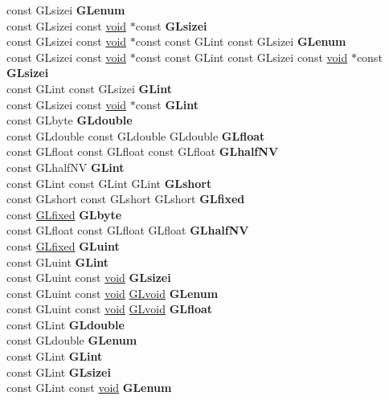 \begin{DoxyCompactItemize}
\begin{tabbing}
\>const GLsizei {\bfseries GLenum}\\
\>const GLsizei const \hyperlink{interfacevoid}{void} $\ast$const {\bfseries GLsizei}\\
\>const GLsizei const \hyperlink{interfacevoid}{void} $\ast$const const GLint const GLsizei {\bfseries GLenum}\\
\>const GLsizei const \hyperlink{interfacevoid}{void} $\ast$const const GLint const GLsizei const \hyperlink{interfacevoid}{void} $\ast$const {\bfseries GLsizei}\\
\>const GLint const GLsizei {\bfseries GLint}\\
\>const GLsizei const \hyperlink{interfacevoid}{void} $\ast$const {\bfseries GLint}\\
\>const GLbyte {\bfseries GLdouble}\\
\>const GLdouble const GLdouble GLdouble {\bfseries GLfloat}\\
\>const GLfloat const GLfloat const GLfloat {\bfseries GLhalfNV}\\
\>const GLhalfNV {\bfseries GLint}\\
\>const GLint const GLint GLint {\bfseries GLshort}\\
\>const GLshort const GLshort GLshort {\bfseries GLfixed}\\
\>const \hyperlink{glheader_8h_ad6d3fa892df40dedf48ee6d84529ae5e}{GLfixed} {\bfseries GLbyte}\\
\>const GLfloat const GLfloat GLfloat {\bfseries GLhalfNV}\\
\>const \hyperlink{glheader_8h_ad6d3fa892df40dedf48ee6d84529ae5e}{GLfixed} {\bfseries GLuint}\\
\>const GLuint {\bfseries GLint}\\
\>const GLuint const \hyperlink{interfacevoid}{void} {\bfseries GLsizei}\\
\>const GLuint const \hyperlink{interfacevoid}{void} \hyperlink{interfacevoid}{GLvoid} {\bfseries GLenum}\\
\>const GLuint const \hyperlink{interfacevoid}{void} \hyperlink{interfacevoid}{GLvoid} {\bfseries GLfloat}\\
\>const GLint {\bfseries GLdouble}\\
\>const GLdouble {\bfseries GLenum}\\
\>const GLint {\bfseries GLint}\\
\>const GLint {\bfseries GLsizei}\\
\>const GLint const \hyperlink{interfacevoid}{void} {\bfseries GLenum}\\

\end{tabbing}
\end{DoxyCompactItemize}
